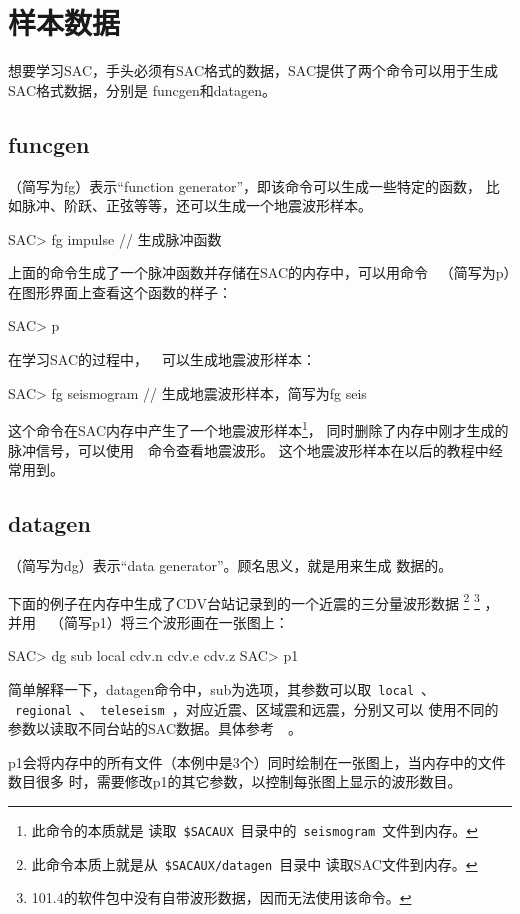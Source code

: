\section{样本数据}

想要学习SAC，手头必须有SAC格式的数据，SAC提供了两个命令可以用于生成SAC格式数据，分别是
funcgen和datagen。

\subsection{funcgen}
（简写为fg）表示``function generator''，即该命令可以生成一些特定的函数，
比如脉冲、阶跃、正弦等等，还可以生成一个地震波形样本。
\begin{SACCode}
SAC> fg impulse         // 生成脉冲函数
\end{SACCode}
上面的命令生成了一个脉冲函数并存储在SAC的内存中，可以用命令~
（简写为p）在图形界面上查看这个函数的样子：
\begin{SACCode}
SAC> p
\end{SACCode}
在学习SAC的过程中，~~可以生成地震波形样本：
\begin{SACCode}
SAC> fg seismogram      // 生成地震波形样本，简写为fg seis
\end{SACCode}
这个命令在SAC内存中产生了一个地震波形样本\footnote{此命令的本质就是
读取~\lstinline{$SACAUX}~目录中的~\lstinline{seismogram}~文件到内存。}，
同时删除了内存中刚才生成的脉冲信号，可以使用~~命令查看地震波形。
这个地震波形样本在以后的教程中经常用到。

\subsection{datagen}
（简写为dg）表示``data generator''。顾名思义，就是用来生成
数据的。

下面的例子在内存中生成了CDV台站记录到的一个近震的三分量波形数据
\footnote{此命令本质上就是从~\lstinline{$SACAUX/datagen}~目录中
读取SAC文件到内存。}
\footnote{101.4的软件包中没有自带波形数据，因而无法使用该命令。}
，并用~~（简写p1）将三个波形画在一张图上：
\begin{SACCode}
SAC> dg sub local cdv.n cdv.e cdv.z
SAC> p1 
\end{SACCode}
简单解释一下，datagen命令中，sub为选项，其参数可以取~\lstinline{local}~、
~\lstinline{regional}~、~\lstinline{teleseism}~，对应近震、区域震和远震，分别又可以
使用不同的参数以读取不同台站的SAC数据。具体参考~~。

p1会将内存中的所有文件（本例中是3个）同时绘制在一张图上，当内存中的文件数目很多
时，需要修改p1的其它参数，以控制每张图上显示的波形数目。
